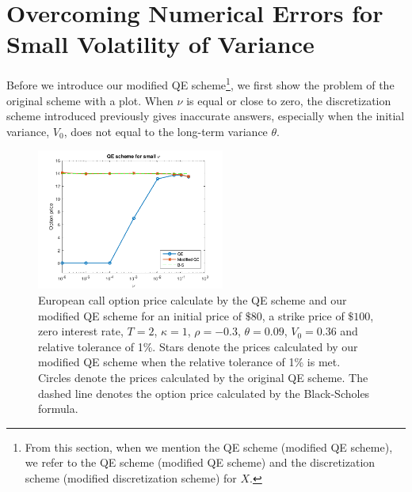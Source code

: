 \documentclass{ws-ijfe}
\begin{document}
\section{Overcoming Numerical Errors for Small Volatility of Variance}


Before we introduce our modified QE scheme\footnote{From this section, when we mention the QE scheme (modified QE scheme), we refer to the QE scheme (modified QE scheme) and the discretization scheme (modified discretization scheme) for $X$.}, we first show the problem of the original scheme with a plot.
When $\nu$ is equal or close to zero, the discretization scheme introduced previously gives inaccurate answers, especially when the initial variance, $V_0$, does not equal to the long-term variance $\theta$.

\begin{figure}[h]
\centering
\includegraphics[width=0.55\textwidth]{Figure2_3_1.eps}
\caption{European call option price calculate by the QE scheme and our modified QE scheme for an initial price of $\$80$, a strike price of $\$100$, zero interest rate, $T=2$, $\kappa=1$, $\rho=-0.3$, $\theta=0.09$, $V_0=0.36$ and relative tolerance of 1\%. Stars denote the prices calculated by our modified QE scheme when the relative tolerance of 1\% is met. Circles denote the prices calculated by the original QE scheme. The dashed line denotes the option price calculated by the Black-Scholes formula.}
\end{figure}
\end{document}
